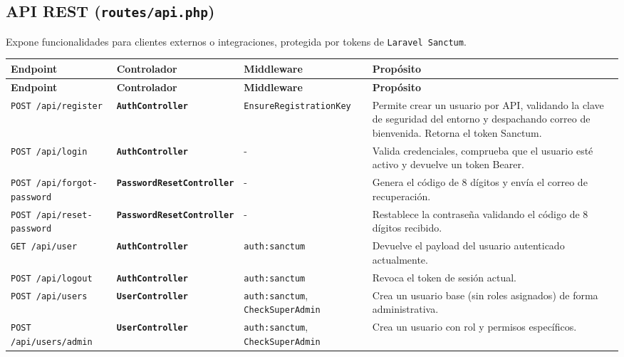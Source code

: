 \documentclass{article}
\begin{document}
\subsection{API REST (\texttt{routes/api.php})}

Expone funcionalidades para clientes externos o integraciones, protegida por tokens de \texttt{Laravel Sanctum}.

\begin{longtable}{>{\raggedright\arraybackslash}p{4cm} >{\raggedright\arraybackslash}p{3cm} >{\raggedright\arraybackslash}p{3.5cm} >{\raggedright\arraybackslash}p{4.5cm}}
\toprule
\textbf{Endpoint} & \textbf{Controlador} & \textbf{Middleware} & \textbf{Propósito} \\
\midrule
\endfirsthead
\toprule
\textbf{Endpoint} & \textbf{Controlador} & \textbf{Middleware} & \textbf{Propósito} \\
\midrule
\endhead
\bottomrule
\endfoot
\bottomrule
\endlastfoot
\texttt{POST /api/register} & \textbf{\texttt{AuthController}} & \texttt{EnsureRegistrationKey} & Permite crear un usuario por API, validando la clave de seguridad del entorno y despachando correo de bienvenida. Retorna el token Sanctum. \\
\texttt{POST /api/login} & \textbf{\texttt{AuthController}} & - & Valida credenciales, comprueba que el usuario esté activo y devuelve un token Bearer. \\
\texttt{POST /api/forgot-password} & \textbf{\texttt{PasswordResetController}} & - & Genera el código de 8 dígitos y envía el correo de recuperación. \\
\texttt{POST /api/reset-password} & \textbf{\texttt{PasswordResetController}} & - & Restablece la contraseña validando el código de 8 dígitos recibido. \\
\texttt{GET /api/user} & \textbf{\texttt{AuthController}} & \texttt{auth:sanctum} & Devuelve el payload del usuario autenticado actualmente. \\
\texttt{POST /api/logout} & \textbf{\texttt{AuthController}} & \texttt{auth:sanctum} & Revoca el token de sesión actual. \\
\texttt{POST /api/users} & \textbf{\texttt{UserController}} & \texttt{auth:sanctum}, \texttt{CheckSuperAdmin} & Crea un usuario base (sin roles asignados) de forma administrativa. \\
\texttt{POST /api/users/admin} & \textbf{\texttt{UserController}} & \texttt{auth:sanctum}, \texttt{CheckSuperAdmin} & Crea un usuario con rol y permisos específicos. \\

\end{longtable}
\end{document}
